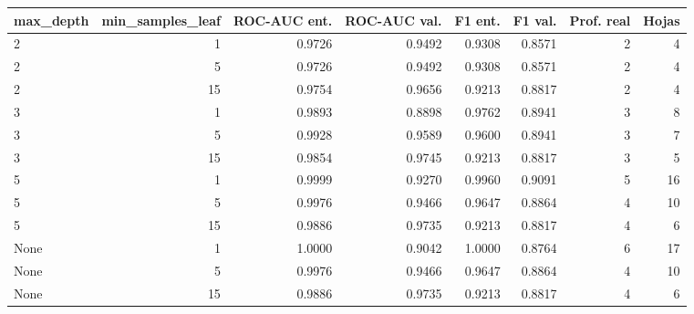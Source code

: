 \begin{tabular}{lrrrrrrr}
\toprule
max\_depth & min\_samples\_leaf & ROC-AUC ent. & ROC-AUC val. & F1 ent. & F1 val. & Prof. real & Hojas \\
\midrule
2 & 1 & 0.9726 & 0.9492 & 0.9308 & 0.8571 & 2 & 4 \\
2 & 5 & 0.9726 & 0.9492 & 0.9308 & 0.8571 & 2 & 4 \\
2 & 15 & 0.9754 & 0.9656 & 0.9213 & 0.8817 & 2 & 4 \\
3 & 1 & 0.9893 & 0.8898 & 0.9762 & 0.8941 & 3 & 8 \\
3 & 5 & 0.9928 & 0.9589 & 0.9600 & 0.8941 & 3 & 7 \\
3 & 15 & 0.9854 & 0.9745 & 0.9213 & 0.8817 & 3 & 5 \\
5 & 1 & 0.9999 & 0.9270 & 0.9960 & 0.9091 & 5 & 16 \\
5 & 5 & 0.9976 & 0.9466 & 0.9647 & 0.8864 & 4 & 10 \\
5 & 15 & 0.9886 & 0.9735 & 0.9213 & 0.8817 & 4 & 6 \\
None & 1 & 1.0000 & 0.9042 & 1.0000 & 0.8764 & 6 & 17 \\
None & 5 & 0.9976 & 0.9466 & 0.9647 & 0.8864 & 4 & 10 \\
None & 15 & 0.9886 & 0.9735 & 0.9213 & 0.8817 & 4 & 6 \\
\bottomrule
\end{tabular}
